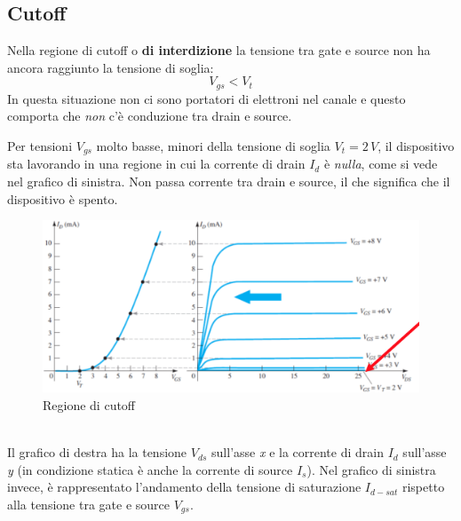 \documentclass[12pt, a4paper]{report}
\begin{document}
\subsection{Cutoff}
Nella regione di cutoff o \textbf{di interdizione} la tensione tra gate e source non ha ancora raggiunto la tensione di soglia:
\begin{equation}
    V_{gs} < V_{t}
\end{equation}
In questa situazione non ci sono portatori di elettroni nel canale e questo comporta che \textit{non} c'è conduzione tra drain e source.

Per tensioni $V_{gs}$ molto basse, minori della tensione di soglia $V_{t} = 2\,V$, il dispositivo sta lavorando in una regione in cui la corrente di drain $I_{d}$ è \textit{nulla}, come si vede nel grafico di sinistra. Non passa corrente tra drain e source, il che significa che il dispositivo è spento.
\begin{figure}[h]
    \centering
    \includegraphics[scale=0.39,angle=0]{n_mos_cutoff.png}
    \caption{Regione di cutoff}
\end{figure}
\\Il grafico di destra ha la tensione $V_{ds}$ sull'asse \textit{x} e la corrente di drain $I_{d}$ sull'asse \textit{y} (in condizione statica è anche la corrente di source $I_{s}$). Nel grafico di sinistra invece, è rappresentato l'andamento della tensione di saturazione $I_{d-sat}$ rispetto alla tensione tra gate e source $V_{gs}$.
\end{document}
